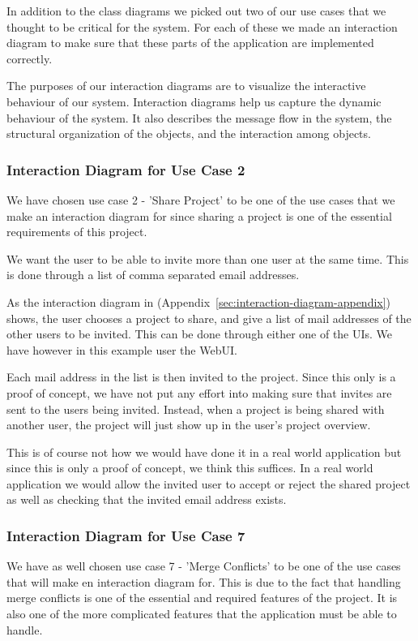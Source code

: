 In addition to the class diagrams we picked out two of our use cases that we thought to be critical for the system. For each of these we made an interaction diagram
to make sure that these parts of the application are implemented correctly. 

The purposes of our interaction diagrams are to visualize the interactive behaviour of our system. Interaction diagrams help us capture the dynamic behaviour of 
the system. It also describes the message flow in the system, the structural organization of the objects, and the interaction among objects.

\subsubsection{Interaction Diagram for Use Case 2}

We have chosen use case 2 - 'Share Project' to be one of the use cases that we make an interaction diagram for since sharing a project is one of the essential
requirements of this project. 

We want the user to be able to invite more than one user at the same time. This is done through a list of comma separated email addresses. 

As the interaction diagram in (Appendix~\ref{sec:interaction-diagram-appendix})
shows, the user chooses a project to share, and give a list of mail addresses of the other users to be invited. This can be done through
either one of the UIs. We have however in this example user the WebUI. 

Each mail address in the list is then invited to the project. Since this only is a proof of concept, we have not put any effort into making sure that invites 
are sent to the users being invited. Instead, when a project is being shared with another user, the project will just show up in the user's project overview.

This is of course not how we would have done it in a real world application but since this is only a proof of concept, we think this suffices. In a 
real world application we would allow the invited user to accept or reject the shared project as well as checking that the invited email address exists.

\subsubsection{Interaction Diagram for Use Case 7}

We have as well chosen use case 7 - 'Merge Conflicts' to be one of the use cases that will make en interaction diagram for. This is due to the fact
that handling merge conflicts is one of the essential and required features of the project. It is also one of the more complicated features that
the application must be able to handle.

